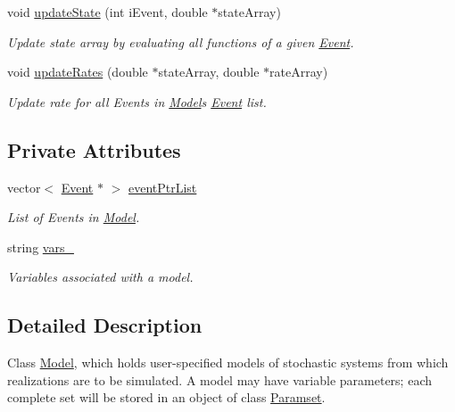 \begin{DoxyCompactItemize}
void \hyperlink{class_model_ad9e7a181a31a2a9fab052d11b1984afd}{update\+State} (int i\+Event, double $\ast$state\+Array)
\begin{DoxyCompactList}\small\item\em Update state array by evaluating all functions of a given \hyperlink{class_event}{Event}. \end{DoxyCompactList}\item 
void \hyperlink{class_model_a3f2fd71261c87162718864d7efc67f2f}{update\+Rates} (double $\ast$state\+Array, double $\ast$rate\+Array)
\begin{DoxyCompactList}\small\item\em Update rate for all Events in \hyperlink{class_model}{Model}\textquotesingle{}s \hyperlink{class_event}{Event} list. \end{DoxyCompactList}\end{DoxyCompactItemize}
\subsection*{Private Attributes}
\begin{DoxyCompactItemize}
\item 
\mbox{\label{class_model_ab1a536085bce5b910dd354e396583db6}} 
vector$<$ \hyperlink{class_event}{Event} $\ast$ $>$ \hyperlink{class_model_ab1a536085bce5b910dd354e396583db6}{event\+Ptr\+List}
\begin{DoxyCompactList}\small\item\em List of Events in \hyperlink{class_model}{Model}. \end{DoxyCompactList}\item 
\mbox{\label{class_model_a713e115e1b8d997490d80d877ffb4740}} 
string \hyperlink{class_model_a713e115e1b8d997490d80d877ffb4740}{vars\+\_\+}
\begin{DoxyCompactList}\small\item\em Variables associated with a model. \end{DoxyCompactList}\end{DoxyCompactItemize}


\subsection{Detailed Description}
Class \hyperlink{class_model}{Model}, which holds user-\/specified models of stochastic systems from which realizations are to be simulated. A model may have variable parameters; each complete set will be stored in an object of class \hyperlink{class_paramset}{Paramset}. 

